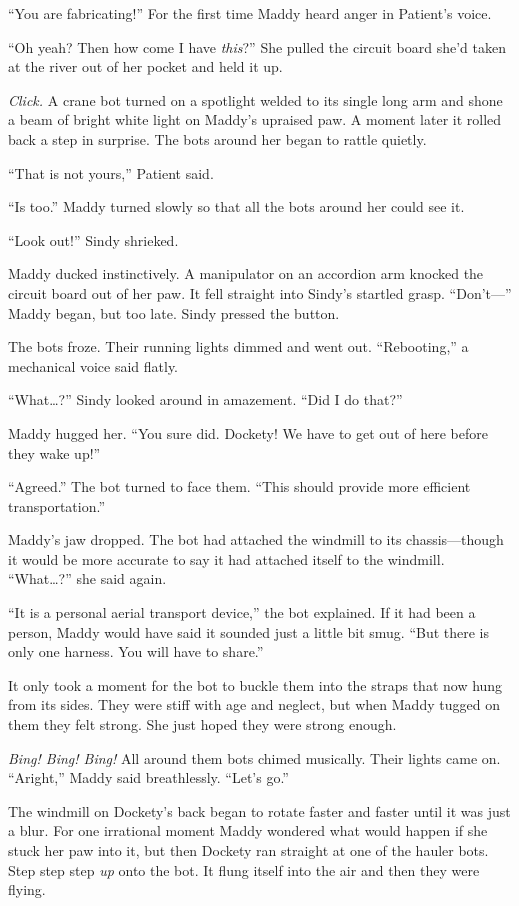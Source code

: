 \documentclass[10pt]{article}
\begin{document}
``You are fabricating!'' For the first time Maddy heard anger in
Patient's voice.

``Oh yeah? Then how come I have \emph{this}?'' She pulled the circuit
board she'd taken at the river out of her pocket and held it up.

\emph{Click.} A crane bot turned on a spotlight welded to its single
long arm and shone a beam of bright white light on Maddy's upraised paw.
A moment later it rolled back a step in surprise. The bots around her
began to rattle quietly.

``That is not yours,'' Patient said.

``Is too.'' Maddy turned slowly so that all the bots around her could
see it.

``Look out!'' Sindy shrieked.

Maddy ducked instinctively. A manipulator on an accordion arm knocked
the circuit board out of her paw. It fell straight into Sindy's startled
grasp. ``Don't---'' Maddy began, but too late. Sindy pressed the button.

The bots froze. Their running lights dimmed and went out. ``Rebooting,''
a mechanical voice said flatly.

``What\ldots{}?'' Sindy looked around in amazement. ``Did I do that?''

Maddy hugged her. ``You sure did. Dockety! We have to get out of here
before they wake up!''

``Agreed.'' The bot turned to face them. ``This should provide more
efficient transportation.''

Maddy's jaw dropped. The bot had attached the windmill to its
chassis---though it would be more accurate to say it had attached itself
to the windmill. ``What\ldots{}?'' she said again.

``It is a personal aerial transport device,'' the bot explained. If it
had been a person, Maddy would have said it sounded just a little bit
smug. ``But there is only one harness. You will have to share.''

It only took a moment for the bot to buckle them into the straps that
now hung from its sides. They were stiff with age and neglect, but when
Maddy tugged on them they felt strong. She just hoped they were strong
enough.

\emph{Bing! Bing! Bing!} All around them bots chimed musically. Their
lights came on. ``Aright,'' Maddy said breathlessly. ``Let's go.''

The windmill on Dockety's back began to rotate faster and faster until
it was just a blur. For one irrational moment Maddy wondered what would
happen if she stuck her paw into it, but then Dockety ran straight at
one of the hauler bots. Step step step \emph{up} onto the bot. It flung
itself into the air and then they were flying.
\end{document}
